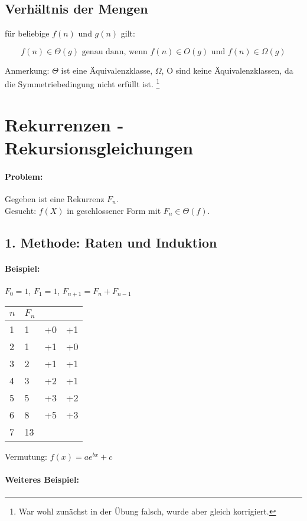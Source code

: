 \documentclass[a4paper,twoside,DIV15,BCOR12mm]{scrbook}
\begin{document}
\subsection{Verhältnis der Mengen}

für beliebige $f(n)$ und $g(n)$ gilt:

$$ f(n)\in\Theta(g) \text{ genau dann, wenn } f(n)\in O(g) \text{ und } f(n)\in\Omega(g) $$

Anmerkung: $\Theta$ ist eine Äquivalenzklasse, $\Omega$, O sind keine Äquivalenzklassen, da die Symmetriebedingung nicht erfüllt ist. \footnote{War wohl zunächst in der Übung falsch, wurde aber gleich korrigiert.}

\section{Rekurrenzen - Rekursionsgleichungen}

\paragraph{Problem:} Gegeben ist eine Rekurrenz $F_n$. \\ Gesucht: $f(X)$ in geschlossener Form mit $F_n\in \Theta(f)$.

\subsection{1. Methode: \glqq Raten und Induktion\grqq}

\paragraph{Beispiel:}

$F_0  = 1$, $F_1 = 1$, $F_{n+1}  = F_n + F_{n-1}$

\begin{tabular}{llll}
$n$ & $F_n$ \\
\hline
1 & 1 & +0  & +1 \\
2 & 1 & +1 & +0\\
3 & 2 & +1 & +1\\
4 & 3 &+2 & +1 \\
5 & 5 & +3 & +2\\
6 & 8 &+5 &+3 \\
7 & 13  
\end{tabular}

Vermutung: $f(x) = ae^{bx}+c$

\paragraph{Weiteres Beispiel:}\hspace{0.1mm}
\end{document}
